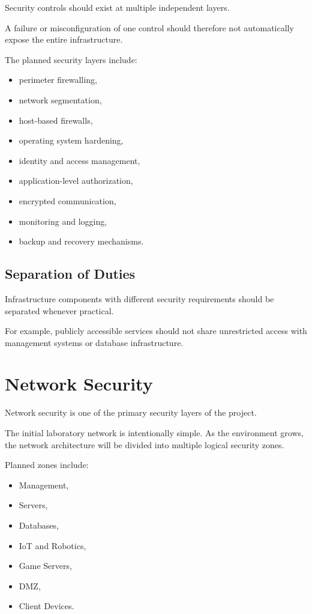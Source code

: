 Security controls should exist at multiple independent layers.

A failure or misconfiguration of one control should therefore not
automatically expose the entire infrastructure.

The planned security layers include:

\begin{itemize}
    \item perimeter firewalling,
    \item network segmentation,
    \item host-based firewalls,
    \item operating system hardening,
    \item identity and access management,
    \item application-level authorization,
    \item encrypted communication,
    \item monitoring and logging,
    \item backup and recovery mechanisms.
\end{itemize}

\subsection{Separation of Duties}

Infrastructure components with different security requirements should
be separated whenever practical.

For example, publicly accessible services should not share unrestricted
access with management systems or database infrastructure.


\section{Network Security}

Network security is one of the primary security layers of the project.

The initial laboratory network is intentionally simple. As the environment
grows, the network architecture will be divided into multiple logical
security zones.

Planned zones include:

\begin{itemize}
    \item Management,
    \item Servers,
    \item Databases,
    \item IoT and Robotics,
    \item Game Servers,
    \item DMZ,
    \item Client Devices.
\end{itemize}

